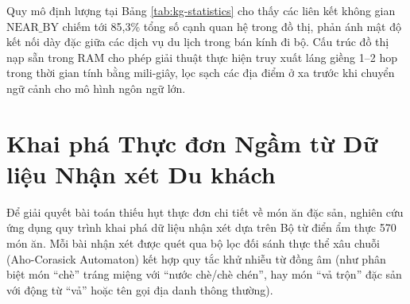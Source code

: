 \begin{table}[H]
\centering
\caption{Thống kê định lượng các thành phần trong Đồ thị Tri thức Không gian toàn mạng lưới (bao phủ 612 địa điểm trọng tâm tại Huế)}
\label{tab:kg-statistics}
\end{table}

Quy mô định lượng tại Bảng \ref{tab:kg-statistics} cho thấy các liên kết không gian $\text{NEAR\_BY}$ chiếm tới 85,3\% tổng số cạnh quan hệ trong đồ thị, phản ánh mật độ kết nối dày đặc giữa các dịch vụ du lịch trong bán kính đi bộ. Cấu trúc đồ thị nạp sẵn trong RAM cho phép giải thuật thực hiện truy xuất láng giềng 1--2 hop trong thời gian tính bằng mili-giây, lọc sạch các địa điểm ở xa trước khi chuyển ngữ cảnh cho mô hình ngôn ngữ lớn.

\section{Khai phá Thực đơn Ngầm từ Dữ liệu Nhận xét Du khách}
\label{sec:ch1-menu-mining}

Để giải quyết bài toán thiếu hụt thực đơn chi tiết về món ăn đặc sản, nghiên cứu ứng dụng quy trình khai phá dữ liệu nhận xét dựa trên Bộ từ điển ẩm thực 570 món ăn. Mỗi bài nhận xét được quét qua bộ lọc đối sánh thực thể xâu chuỗi (Aho-Corasick Automaton) kết hợp quy tắc khử nhiễu từ đồng âm (như phân biệt món ``chè'' tráng miệng với ``nước chè/chè chén'', hay món ``vả trộn'' đặc sản với động từ ``vả'' hoặc tên gọi địa danh thông thường).


